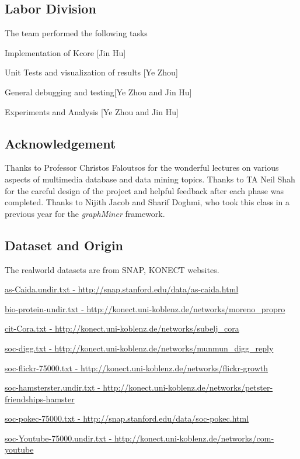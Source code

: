 
\subsection{Labor Division}

The team performed the following tasks
\bit
\item Implementation of Kcore [Jin Hu]
\item Unit Tests and visualization of results [Ye Zhou]
\item General debugging and testing[Ye Zhou and Jin Hu]
\item Experiments and Analysis [Ye Zhou and Jin Hu]
\eit


\subsection{Acknowledgement}

Thanks to Professor Christos Faloutsos for the wonderful lectures on various aspects of multimedia database and data mining topics. Thanks to TA Neil Shah for the careful design of the project and helpful feedback after each phase was completed. Thanks to Nijith Jacob and Sharif Doghmi, who took this class in a previous year for the {\em graphMiner} framework.

\subsection{Dataset and Origin}


The realworld datasets are from SNAP, KONECT websites.


\url{as-Caida.undir.txt - http://snap.stanford.edu/data/as-caida.html}

\url{bio-protein-undir.txt - http://konect.uni-koblenz.de/networks/moreno_propro}

\url{cit-Cora.txt - http://konect.uni-koblenz.de/networks/subelj_cora}

\url{soc-digg.txt - http://konect.uni-koblenz.de/networks/munmun_digg_reply}

\url{soc-flickr-75000.txt - http://konect.uni-koblenz.de/networks/flickr-growth}

\url{soc-hamsterster.undir.txt - http://konect.uni-koblenz.de/networks/petster-friendships-hamster}

\url{soc-pokec-75000.txt - http://snap.stanford.edu/data/soc-pokec.html}

\url{soc-Youtube-75000.undir.txt - http://konect.uni-koblenz.de/networks/com-youtube}

